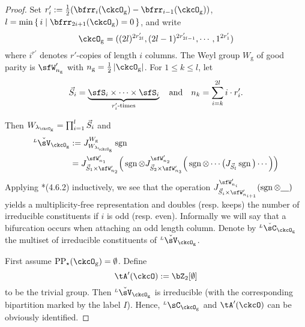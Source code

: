 \documentclass[12pt,a4paper]{amsart}
\def\abs#1{\left|{#1}\right|}
\newcommand{\sgn}{\operatorname{sgn}}
\numberwithin{equation}{section}
\theoremstyle{remark}
\def\half{{\tfrac{1}{2}}}
\def\lamckg{\lambda_{\ckcO_{\mathrm g}}}
\def\LC{{}^{\scriptscriptstyle L}\sC}
\def\ckLC{{}^{\scriptscriptstyle L}\check{\sC}}
\def\ckLV{{}^{\scriptscriptstyle L}\check\sV}
\def\ckLC{{}^{\scriptscriptstyle L}\check\sC}
\def\Wg{W_{\mathrm g}}
\def\AND{\quad \text{and} \quad}
\def\CPPs{\mathrm{PP}_{\star}}
\begin{document}
\begin{proof}
    Set $r'_{i} := \half(\bfrr_{i}(\ckcO_{\mathrm g})-\bfrr_{i-1}(\ckcO_{\mathrm g}))$,
    $l =\min\set{i|\bfrr_{2i+1}(\ckcO_{\mathrm g})=0}$, and write
    \[
      \ckcO_{\mathrm g} %
      = ((2l)^{2r'_{2l}}, (2l-1)^{2r'_{2l-1}},\cdots, 1^{2r'_{1}})
    \]
    where $i^{r'}$ denotes $r'$-copies of length $i$ columns.
    The Weyl group $W_{\mathrm g}$ of good parity is $\sfW'_{n_{\mathrm g}}$ with
    $n_{\mathrm g} = \half\abs{\ckcO_{\mathrm g}}$. For $1\leq k\leq l$, let
    \[
      \vec{S}_{i} = \underbrace{\sfS_{i}\times \cdots\times \sfS_{i}}_{r'_{i}\text{-times}} \AND n_{k} = \sum_{i=k}^{2l} i\cdot r'_{i}.
    \]

    Then $W_{\lamckg}=\prod_{i=1}^{l} \vec{S}_{i}$ and
    \[
      \begin{split}
        \ckLV_{\ckcO_{\mathrm g}}& :=J_{W_{\lamckg}}^{\Wg}\sgn\\
        & = J_{\vec{S}_{1}\times \sfW'_{n_{2}}}^{\sfW'_{n_{1}}} \Big(\sgn \otimes J_{\vec{S}_{2}\times \sfW'_{n_{3}}}^{\sfW'_{n_{2}}}\Big(\sgn
        \otimes \cdots\big(J_{\vec{S}_{l}} \sgn\big)\cdots \Big)\Big) \\
      \end{split}
    \]
    Applying \cite{Lu}*{(4.6.2)} inductively, we see that the operation
    $J_{\vec{S}_{i}\times \sfW'_{n_{i+1}}}^{\sfW'_{n_{i}}}(\sgn \otimes \underline{\ \ \ })$ yields a multiplicity-free representation and
    doubles (resp. keeps) the number of irreducible constituents if $i$ is odd (resp. even). Informally we will say that a bifurcation occurs when attaching an odd length column.
    Denote by $\ckLC_{\ckcO_{\mathrm g}}$ the multiset of irreducible constituents of $\ckLV_{\ckcO_{\mathrm g}}$.

    First assume $\CPPs(\ckcO_{\mathrm g}) = \emptyset$. Define
    \[
      \tA'(\ckcO):= \bZ_{2}[\emptyset]
    \]
    to be the trivial group.
    Then $\ckLV_{\ckcO_{\mathrm g}}$ is
    irreducible (with the corresponding bipartition marked by the label $I$).  Hence, $\LC_{\ckcO_{\mathrm g}}$
    and $\tA'(\ckcO)$ can be obviously identified.



\end{proof}
\end{document}
